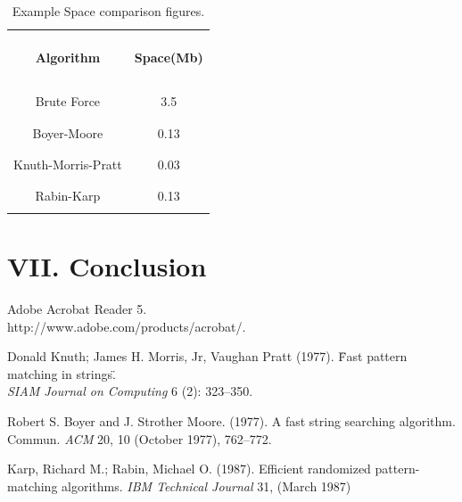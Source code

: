 \documentclass{chi2005}
\begin{document}
\begin{table}
  \begin{center}
  \begin{tabular}{|c|c|}
  \hline
          &   \\
  {\bf Algorithm} & \parbox{1in}{\begin{center}\bf Space(Mb) \end{center}}\\
          &   \\
  \hline
          &   \\
  Brute Force  & 3.5  \\
          &   \\
  \hline
          &    \\
  Boyer-Moore & 0.13 \\
          &    \\
  \hline
          &    \\
  Knuth-Morris-Pratt & 0.03 \\
          &    \\
   \hline
          &    \\
  Rabin-Karp & 0.13 \\
          &    \\
  \hline
  \end{tabular}
  \end{center}
  \caption{Example Space comparison figures.}
  \label{table2}
\end{table}

\section{VII. Conclusion}



\newpage

\begin{thebibliography}{9}
Adobe Acrobat Reader 5. \\
http://www.adobe.com/products/acrobat/.

Donald Knuth; James H. Morris, Jr, Vaughan Pratt (1977). \"Fast pattern matching in strings\". \\
{\em SIAM Journal on Computing} 6 (2): 323--350. 

\newpage  %

Robert S. Boyer and J. Strother Moore. (1977). A fast string searching algorithm. Commun. {\em ACM} 20, 10 (October 1977), 762--772.

Karp, Richard M.; Rabin, Michael O. (1987). Efficient randomized pattern-matching algorithms. {\em IBM Technical Journal} 31, (March 1987)

\end{thebibliography}
\end{document}
